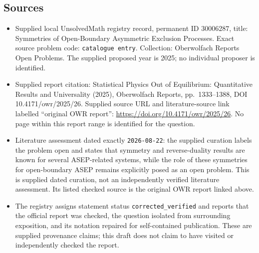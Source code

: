\documentclass[11pt]{article}
\begin{document}
\subsection{Sources}
\begin{itemize}
\item Supplied local UnsolvedMath registry record, permanent ID \(30006287\), title: Symmetries of Open-Boundary Asymmetric Exclusion Processes. Exact source problem code: \texttt{catalogue entry}. Collection: Oberwolfach Reports Open Problems. The supplied proposed year is 2025; no individual proposer is identified.
\item Supplied report citation: Statistical Physics Out of Equilibrium: Quantitative Results and Universality (2025), Oberwolfach Reports, pp.\ 1333--1388, DOI 10.4171/owr/2025/26. Supplied source URL and literature-source link labelled ``original OWR report'': \url{https://doi.org/10.4171/owr/2025/26}. No page within this report range is identified for the question.
\item Literature assessment dated exactly \texttt{2026-08-22}: the supplied curation labels the problem open and states that symmetry and reverse-duality results are known for several ASEP-related systems, while the role of these symmetries for open-boundary ASEP remains explicitly posed as an open problem. This is supplied dated curation, not an independently verified literature assessment. Its listed checked source is the original OWR report linked above.
\item The registry assigns statement status \texttt{corrected\_verified} and reports that the official report was checked, the question isolated from surrounding exposition, and its notation repaired for self-contained publication. These are supplied provenance claims; this draft does not claim to have visited or independently checked the report.
\end{itemize}
\end{document}
